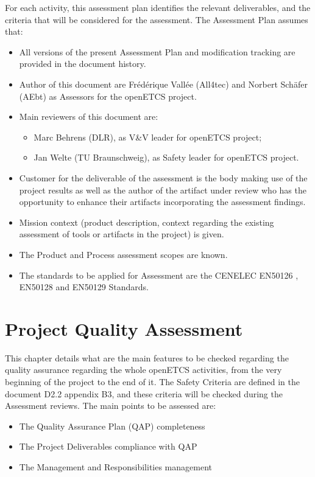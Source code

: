 \documentclass[openetcs]{template/openetcs_article}
\begin{document}
For each activity, this assessment plan identifies the relevant deliverables, and the criteria that will be considered for the assessment.
The Assessment Plan assumes that: 
\begin{itemize}
\item All versions of the present Assessment Plan and modification tracking are provided in the document history.
\item Author of this document are Fr\'ed\'erique Vall\'ee (All4tec) and Norbert Sch\"afer (AEbt) as Assessors for the openETCS project.
\item Main reviewers of this document are:
	\begin{itemize}
	\item Marc Behrens (DLR), as V\&V leader for openETCS project;
	\item Jan Welte (TU Braunschweig), as Safety leader for openETCS project.
	\end{itemize}
\item Customer for the deliverable of the assessment is the body making use of the project results as well as the author of the artifact under review who has the opportunity to enhance their artifacts incorporating the assessment findings.
\item Mission context (product description, context regarding the existing assessment of tools or artifacts in the project) is given.
\item The Product and Process assessment scopes are known.
\item The standards to be applied for Assessment are the CENELEC EN50126 \cite{EN50126} , EN50128 \cite{EN50128} and EN50129 \cite{EN50129} Standards.
\end{itemize}


\newpage
\section{Project Quality Assessment}
This chapter details what are the main features to be checked regarding the quality assurance regarding the whole openETCS activities, from the very beginning
of the project to the end of it.
The Safety Criteria are defined in the document D2.2 appendix B3, and these criteria will be checked during the Assessment reviews. The main points to
be assessed are:
\begin{itemize}
\item The Quality Assurance Plan (QAP) completeness
\item The Project Deliverables compliance with QAP
\item The Management and Responsibilities management 
\end{itemize}
\end{document}
